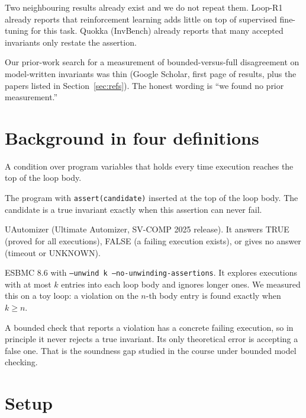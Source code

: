 \documentclass[11pt]{article}
\newcommand{\code}[1]{\texttt{#1}}
\begin{document}
Two neighbouring results already exist and we do not repeat them. Loop-R1 already reports that
reinforcement learning adds little on top of supervised fine-tuning for this task. Quokka
(InvBench) already reports that many accepted invariants only restate the assertion.

Our prior-work search for a measurement of bounded-versus-full disagreement on model-written
invariants was thin (Google Scholar, first page of results, plus the papers listed in
Section~\ref{sec:refs}). The honest wording is ``we found no prior measurement.''

\section{Background in four definitions}

\begin{description}[leftmargin=1.2em]
\item[Loop invariant.] A condition over program variables that holds every time execution reaches
the top of the loop body.
\item[Correctness query.] The program with \code{assert(candidate)} inserted at the top of the loop
body. The candidate is a true invariant exactly when this assertion can never fail.
\item[Full verifier.] UAutomizer (Ultimate Automizer, SV-COMP 2025 release). It answers TRUE (proved
for all executions), FALSE (a failing execution exists), or gives no answer (timeout or UNKNOWN).
\item[Bounded check.] ESBMC 8.6 with \code{--unwind k --no-unwinding-assertions}. It explores
executions with at most $k$ entries into each loop body and ignores longer ones. We measured this
on a toy loop: a violation on the $n$-th body entry is found exactly when $k \ge n$.
\end{description}

A bounded check that reports a violation has a concrete failing execution, so in principle it
never rejects a true invariant. Its only theoretical error is accepting a false one. That is the
soundness gap studied in the course under bounded model checking.

\section{Setup}
\end{document}
